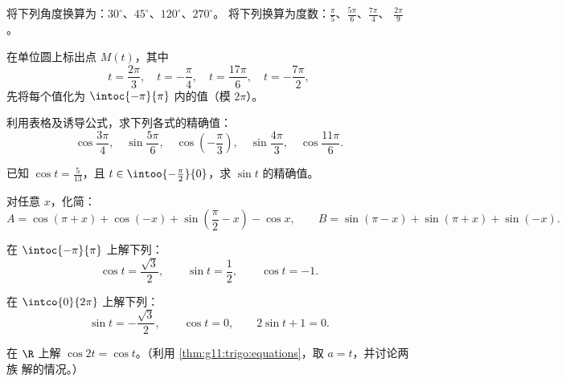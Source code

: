 \begin{exercise}[$\star$]\label{exo:g11:trigo:1}
将下列角度换算为：$30^\circ$、$45^\circ$、$120^\circ$、$270^\circ$。
将下列换算为度数：$\frac{\pi}{5}$、$\frac{5\pi}{6}$、$\frac{7\pi}{4}$、
$\frac{2\pi}{9}$。
\end{exercise}

\begin{exercise}[$\star$]\label{exo:g11:trigo:2}
在单位圆上标出点 $M(t)$，其中
\[
t = \frac{2\pi}{3},\quad
t = -\frac{\pi}{4},\quad
t = \frac{17\pi}{6},\quad
t = -\frac{7\pi}{2},
\]
先将每个值化为 $\intoc{-\pi}{\pi}$ 内的值（模 $2\pi$）。
\end{exercise}

\begin{exercise}[$\star$]\label{exo:g11:trigo:3}
利用表格及诱导公式，求下列各式的精确值：
\[
\cos\frac{3\pi}{4}, \quad
\sin\frac{5\pi}{6}, \quad
\cos\left(-\frac{\pi}{3}\right), \quad
\sin\frac{4\pi}{3}, \quad
\cos\frac{11\pi}{6} .
\]
\end{exercise}

\begin{exercise}[$\star$]\label{exo:g11:trigo:4}
已知 $\cos t = \frac{5}{13}$，且 $t \in \intoo{-\frac\pi2}{0}$，求
$\sin t$ 的精确值。
\end{exercise}

\begin{exercise}[$\star\star$]\label{exo:g11:trigo:5}
对任意 $x$，化简：
\[
A = \cos(\pi + x) + \cos(-x) + \sin\left(\frac\pi2 - x\right) - \cos x,
\qquad
B = \sin(\pi - x) + \sin(\pi + x) + \sin(-x) .
\]
\end{exercise}

\begin{exercise}[$\star\star$]\label{exo:g11:trigo:6}
在 $\intoc{-\pi}{\pi}$ 上解下列：
\[
\cos t = \frac{\sqrt3}{2}, \qquad
\sin t = \frac12, \qquad
\cos t = -1 .
\]
\end{exercise}

\begin{exercise}[$\star\star$]\label{exo:g11:trigo:7}
在 $\intco{0}{2\pi}$ 上解下列：
\[
\sin t = -\frac{\sqrt3}{2}, \qquad
\cos t = 0, \qquad
2\sin t + 1 = 0 .
\]
\end{exercise}

\begin{exercise}[$\star\star$]\label{exo:g11:trigo:8}
在 $\R$ 上解 $\cos 2t = \cos t$。（利用
\cref{thm:g11:trigo:equations}，取 $a = t$，并讨论两族
解的情况。）
\end{exercise}

